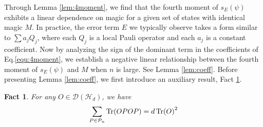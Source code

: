 \documentclass[showpacs,amsmath,amssymb,twocolumn,aps,pra,superscriptaddress,notitlepage,10pt]{revtex4-2}
\newcommand{\cP}{\mathcal P}
\newtheorem{fact}{Fact}
\begin{document}
Through Lemma \ref{lem:4moment}, we find that the fourth moment of $s_E(\psi)$ exhibits a linear dependence on magic for a given set of states with identical magic $M$. In practice, the error term $E$ we typically observe takes a form similar to $\sum a_jQ_j$, where each $Q_j$ is a local Pauli operator and each $a_j$ is a constant coefficient. Now by analyzing the sign of the dominant term in the coefficients of Eq.\eqref{equ:4moment}, we establish a negative linear relationship between the fourth moment of $s_E(\psi)$ and $M$ when $n$ is large. See Lemma \ref{lem:coeff}. Before presenting Lemma \ref{lem:coeff}, we first introduce an auxiliary result, Fact \ref{fact: unchange}.

\begin{fact}\label{fact: unchange}
For any $O\in\mathcal D(\mathcal H_d)$, we have
\begin{equation}
	\sum_{P\in \cP_n}\Tr(OPOP)=d\Tr(O)^2
\end{equation}
\end{fact}
\end{document}
